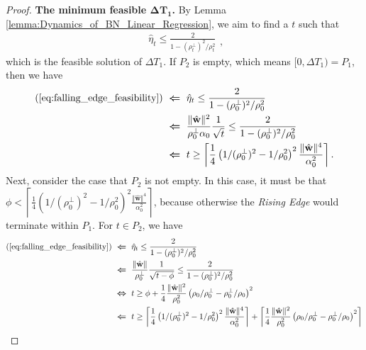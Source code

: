 \documentclass[pdflatex,sn-basic]{sn-jnl}%
\theoremstyle{thmstyleone}%
\begin{document}
\begin{appendices}
\begin{proof}
  \noindent\textbf{The minimum feasible $\boldsymbol{\Delta T_1}$.} 
  By Lemma \ref{lemma:Dynamics_of_BN_Linear_Regression}, we aim to find a $t$ such that 
  \begin{equation}\label{eq:falling_edge_feasibility}
  \begin{aligned}
    \hat{\eta}_t \le \frac{2}{1 - (\rho_t^{\perp})^2 / \rho_t^2} 
  \end{aligned},
  \end{equation}
  which is the feasible solution of $\Delta T_1$. 
  If $P_2$ is empty, which means $[0, \Delta T_1) = P_1$, then we have
  \begin{equation*}
  \begin{aligned}
    (\ref{eq:falling_edge_feasibility})
    & \ \boldsymbol{\Leftarrow} \ 
    \hat{\eta}_t \le \frac{2}{1 - (\rho_0^{\perp})^2 / \rho_0^2}
    \\ & \  \boldsymbol{\Leftarrow} \ 
    \frac{\Vert \hat{\mathbf{w}} \Vert^2 }{
      \rho_{0}^{\perp} \alpha_0
    }
    \frac{1}{ \sqrt{t}}
    \le \frac{2}{1 - (\rho_0^{\perp})^2 / \rho_0^2}
    \\ & \  \boldsymbol{\Leftarrow} \ 
    t \ge 
    \left\lceil
      \frac{1}{4}
      \left(
        1 / (\rho_{0}^{\perp})^2 - 1 / \rho_0^2
      \right)^2
      \frac{\Vert \hat{\mathbf{w}} \Vert^4 }{
        \alpha_0^2
      }
    \right\rceil.
  \end{aligned}
  \end{equation*}
  Next, consider the case that \( P_2 \) is not empty. 
  In this case, it must be that \( \phi < \left\lceil
  \frac{1}{4}
  \left(
    1 / (\rho_{0}^{\perp})^2 - 1 / \rho_0^2
  \right)^2
  \frac{\Vert \hat{\mathbf{w}} \Vert^4 }{
    \alpha_0^2
  }
  \right\rceil \), 
  because otherwise the \textit{Rising Edge} would terminate within \( P_1 \). 
  For \( t \in P_2 \), we have
  \begin{equation*}
  \begin{aligned}
    (\ref{eq:falling_edge_feasibility})
    & \ \boldsymbol{\Leftarrow} \ 
    \hat{\eta}_t \le \frac{2}{1 - (\rho_0^{\perp})^2 / \rho_0^2}
    \\ & \  \boldsymbol{\Leftarrow} \ 
    \frac{\Vert \hat{\mathbf{w}} \Vert}{\rho_{0}^{\perp}}
    \frac{1}{\sqrt{t - \phi}}
    \le \frac{2}{1 - (\rho_0^{\perp})^2 / \rho_0^2}
    \\ & \  \boldsymbol{\Leftrightarrow} \ 
    t \ge
    \phi
    +
    \frac{1}{4}
    \frac{\Vert \hat{\mathbf{w}} \Vert^2}{\rho_{0}^2}
    \left(
      \rho_0 / \rho_0^{\perp} - \rho_0^{\perp} / \rho_0
    \right)^2
    \\ & \  \boldsymbol{\Leftarrow} \ 
    t \ge
    \left\lceil
      \frac{1}{4}
      \left(
        1 / (\rho_{0}^{\perp})^2 - 1 / \rho_0^2
      \right)^2
      \frac{\Vert \hat{\mathbf{w}} \Vert^4 }{
        \alpha_0^2
      }
    \right\rceil
    +
    \left\lceil
    \frac{1}{4}
    \frac{\Vert \hat{\mathbf{w}} \Vert^2}{\rho_{0}^2}
    \left(
      \rho_0 / \rho_0^{\perp} - \rho_0^{\perp} / \rho_0
    \right)^2
    \right\rceil
  \end{aligned}
  \end{equation*}
  

\end{proof}
\end{appendices}
\end{document}
